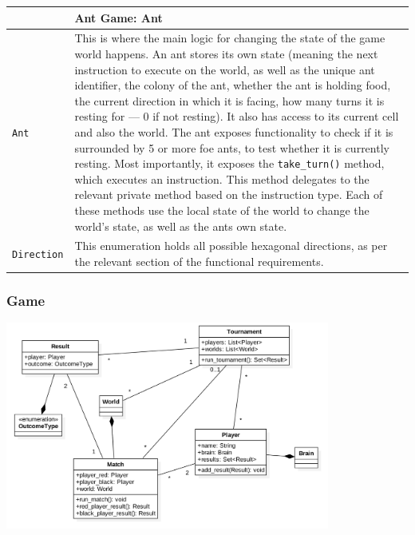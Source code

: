 \documentclass[11pt]{article}
\begin{document}
\begin{longtable}[c]{@{}p{}p{}@{}}
\toprule
& Ant Game: Ant \tabularnewline
\midrule
\texttt{Ant} & This is where the main logic for changing the state of the game world happens. An ant stores its own state (meaning the next instruction to execute on the world, as well as the unique ant identifier, the colony of the ant, whether the ant is holding food, the current direction in which it is facing, how many turns it is resting for --- 0 if not resting). It also has access to its current cell and also the world. The ant exposes functionality to check if it is surrounded by 5 or more foe ants, to test whether it is currently resting. Most importantly, it exposes the \texttt{take\_turn()} method, which executes an instruction. This method delegates to the relevant private method based on the instruction type. Each of these methods use the local state of the world to change the world's state, as well as the ants own state. \tabularnewline
\texttt{Direction} & This enumeration holds all possible hexagonal directions, as per the relevant section of the functional requirements. \tabularnewline
\bottomrule
\end{longtable}

\subsubsection{Game}

\begin{center}
\includegraphics[width=0.8\textwidth]{low-level-diagrams/class/game.png}
\end{center}
\end{document}
